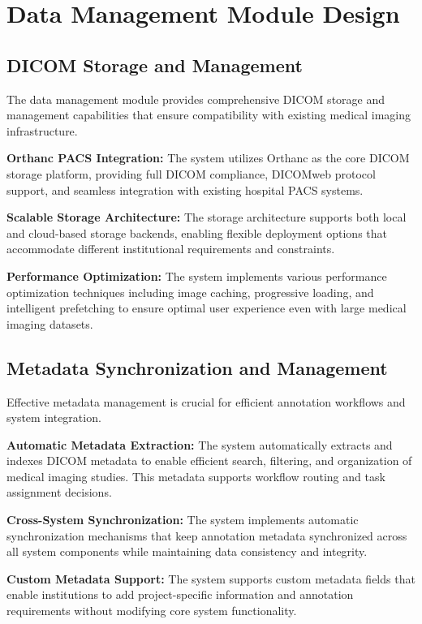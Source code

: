 \section{Data Management Module Design}

\subsection{DICOM Storage and Management}

The data management module provides comprehensive DICOM storage and management capabilities that ensure compatibility with existing medical imaging infrastructure.

\textbf{Orthanc PACS Integration:} The system utilizes Orthanc as the core DICOM storage platform, providing full DICOM compliance, DICOMweb protocol support, and seamless integration with existing hospital PACS systems.

\textbf{Scalable Storage Architecture:} The storage architecture supports both local and cloud-based storage backends, enabling flexible deployment options that accommodate different institutional requirements and constraints.

\textbf{Performance Optimization:} The system implements various performance optimization techniques including image caching, progressive loading, and intelligent prefetching to ensure optimal user experience even with large medical imaging datasets.

\subsection{Metadata Synchronization and Management}

Effective metadata management is crucial for efficient annotation workflows and system integration.

\textbf{Automatic Metadata Extraction:} The system automatically extracts and indexes DICOM metadata to enable efficient search, filtering, and organization of medical imaging studies. This metadata supports workflow routing and task assignment decisions.

\textbf{Cross-System Synchronization:} The system implements automatic synchronization mechanisms that keep annotation metadata synchronized across all system components while maintaining data consistency and integrity.

\textbf{Custom Metadata Support:} The system supports custom metadata fields that enable institutions to add project-specific information and annotation requirements without modifying core system functionality.

